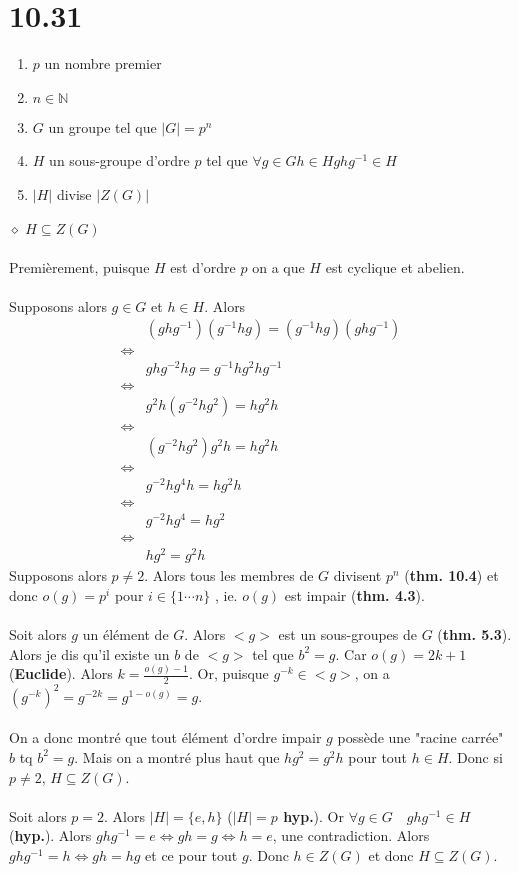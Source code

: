 \documentclass[a4paper,10pt]{article}
\begin{document}
\section*{10.31}
\begin{enumerate}
 \item $p$ un nombre premier
 \item $n \in \mathbb{N}$
 \item $G$ un groupe tel que $|G| = p^n$
 \item $H$ un sous-groupe d'ordre $p$ tel que $\forall g \in G h \in H ghg^{-1} \in H$
 \item $|H|$ divise $|Z(G)|$
\end{enumerate}
$\diamond$ \textbf{$H \subseteq Z(G)$}
\\
\\
Premièrement, puisque $H$ est d'ordre $p$ on a que $H$ est cyclique et abelien. 
\\
\\
Supposons alors $g \in G$ et $h \in H$. Alors 
\begin{align*}
& (ghg^{-1})(g^{-1}hg) = (g^{-1}hg)(ghg^{-1}) \\
\Leftrightarrow \\
& ghg^{-2}hg = g^{-1}hg^2hg^{-1} \\
\Leftrightarrow \\
& g^2h(g^{-2}hg^2) = hg^2h \\ 
\Leftrightarrow \\
& (g^{-2}hg^2)g^2h = hg^2h  \\
\Leftrightarrow \\
& g^{-2}hg^4h = hg^2h \\
\Leftrightarrow \\
& g^{-2}hg^4 = hg^2 \\
\Leftrightarrow \\
& hg^2 = g^2h
\end{align*}
Supposons alors $p \not = 2$. Alors tous les membres de $G$ divisent $p^n$ (\textbf{thm. 10.4}) et donc $o(g) = p^i$ pour $i \in \{1 \cdots n\}$
, ie. $o(g)$ est impair (\textbf{thm. 4.3}). 
\\
\\
Soit alors $g$ un élément de $G$. Alors $<g>$ est un sous-groupes de $G$ (\textbf{thm. 5.3}). Alors je dis qu'il existe un $b$ de $<g>$ tel que 
$b^2 = g$. Car $o(g) = 2k + 1$ (\textbf{Euclide}). Alors $k = \frac{o(g)-1}{2}$. Or, puisque $g^{-k} \in <g>$, on a $(g^{-k})^2 = g^{-2k} = g^{1-o(g)} = g$.
\\
\\
On a donc montré que tout élément d'ordre impair $g$ possède une "racine carrée" $b$ tq $b^2 = g$. Mais on a montré plus haut 
que $hg^2 = g^2h$ pour tout $h \in H$. Donc si $p \not = 2$, $H \subseteq Z(G)$. 
\\
\\
Soit alors $p = 2$. Alors $|H| = \{e,h\}$ (\textbf{$|H| = p$ hyp.}). Or $\forall g\in G \quad ghg^{-1} \in H$ (\textbf{hyp.}). 
Alors $ghg^{-1} = e \Leftrightarrow gh = g \Leftrightarrow h = e$, une contradiction. Alors $ghg^{-1} = h \Leftrightarrow gh = hg$ et ce pour tout
$g$. Donc $h \in Z(G)$ et donc $H \subseteq Z(G)$.
\end{document}
